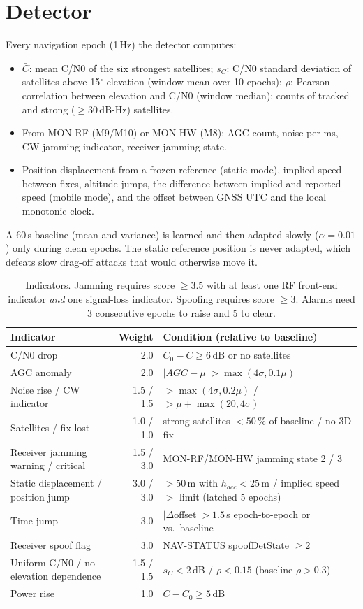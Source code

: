 \documentclass[11pt,a4paper]{article}
\begin{document}
\section{Detector}
Every navigation epoch (1\,Hz) the detector computes:
\begin{itemize}
  \item $\bar C$: mean C/N0 of the six strongest satellites; $s_C$: C/N0 standard deviation of satellites
        above 15$^\circ$ elevation (window mean over 10 epochs); $\rho$: Pearson correlation between elevation and
        C/N0 (window median); counts of tracked and strong ($\geq 30$\,dB-Hz) satellites.
  \item From MON-RF (M9/M10) or MON-HW (M8): AGC count, noise per ms, CW jamming indicator, receiver jamming state.
  \item Position displacement from a frozen reference (static mode), implied speed between fixes, altitude
        jumps, the difference between implied and reported speed (mobile mode), and the offset between GNSS UTC
        and the local monotonic clock.
\end{itemize}
A 60\,s baseline (mean and variance) is learned and then adapted slowly ($\alpha = 0.01$) only during clean
epochs. The static reference position is never adapted, which defeats slow drag-off attacks that would
otherwise move it.

\begin{table}[h]
\centering\small
\begin{tabularx}{\linewidth}{@{}l r >{\raggedright\arraybackslash}X@{}}
\toprule
Indicator & Weight & Condition (relative to baseline) \\ \midrule
C/N0 drop & 2.0 & $\bar C_0 - \bar C \geq 6$\,dB or no satellites \\
AGC anomaly & 2.0 & $|AGC - \mu| > \max(4\sigma, 0.1\mu)$ \\
Noise rise / CW indicator & 1.5 / 1.5 & $> \max(4\sigma, 0.2\mu)$ / $> \mu + \max(20, 4\sigma)$ \\
Satellites / fix lost & 1.0 / 1.0 & strong satellites $< 50$\,\% of baseline / no 3D fix \\
Receiver jamming warning / critical & 1.5 / 3.0 & MON-RF/MON-HW jamming state 2 / 3 \\ \midrule
Static displacement / position jump & 3.0 / 3.0 & $> 50$\,m with $h_{acc} < 25$\,m / implied speed $>$ limit (latched 5 epochs) \\
Time jump & 3.0 & $|\Delta$offset$| > 1.5$\,s epoch-to-epoch or vs.\ baseline \\
Receiver spoof flag & 3.0 & NAV-STATUS spoofDetState $\geq 2$ \\
Uniform C/N0 / no elevation dependence & 1.5 / 1.5 & $s_C < 2$\,dB / $\rho < 0.15$ (baseline $\rho > 0.3$) \\
Power rise & 1.0 & $\bar C - \bar C_0 \geq 5$\,dB \\ \bottomrule
\end{tabularx}
\caption{Indicators. Jamming requires score $\geq 3.5$ with at least one RF front-end indicator \emph{and} one
signal-loss indicator. Spoofing requires score $\geq 3$. Alarms need 3 consecutive epochs to raise and 5 to clear.}
\end{table}
\end{document}
